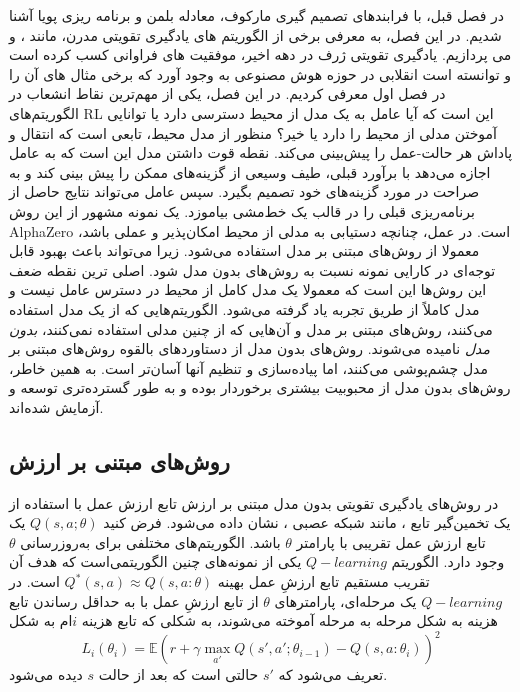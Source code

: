 
در فصل قبل، با فرابندهای تصمیم گیری مارکوف، معادله بلمن و برنامه ریزی پویا آشنا شدیم. در این فصل، به معرفی برخی از الگوریتم های یادگیری تقویتی مدرن، مانند
،
 و 
  می پردازیم. یادگیری تقویتی ژرف در دهه اخیر، موفقیت های فراوانی کسب کرده است و توانسته است انقلابی در حوزه هوش مصنوعی به وجود آورد که برخی مثال های آن را در فصل اول معرفی کردیم. در این فصل، 
یکی از مهم‌ترین نقاط انشعاب در الگوریتم‌‌های RL این است که آیا عامل به یک مدل از محیط دسترسی دارد یا  توانایی آموختن مدلی از محیط را دارد یا خیر؟ منظور از مدل محیط، تابعی است که انتقال و پاداش هر حالت-عمل را پیش‌بینی می‌کند.
نقطه قوت داشتن مدل این است که به عامل اجازه می‌دهد با برآورد قبلی، طیف وسیعی از گزینه‌های ممکن را پیش بینی کند و به صراحت در مورد گزینه‌های خود تصمیم بگیرد. سپس عامل می‌تواند نتایج حاصل از برنامه‌ریزی قبلی را در قالب یک خط‌مشی بیاموزد. یک نمونه مشهور از این روش 
AlphaZero است. در عمل، چنانچه دستیابی به مدلی از محیط امکان‌پذیر و عملی باشد، معمولا از روش‌های مبتنی بر مدل استفاده می‌شود. زیرا می‌تواند باعث بهبود قابل توجه‌ای در کارایی نمونه نسبت به روش‌های بدون مدل شود. اصلی ترین نقطه ضعف این روش‌ها این است که معمولا یک مدل کامل از محیط  در دسترس عامل نیست و مدل کاملاً از طریق تجربه یاد گرفته می‌شود. الگوریتم‌هایی که از یک مدل استفاده می‌کنند، روش‌های مبتنی بر مدل و آن‌هایی که از چنین مدلی استفاده نمی‌کنند، \textit{بدون مدل} نامیده می‌شوند. روش‌های بدون مدل از دستاوردهای بالقوه روش‌های مبتنی بر مدل چشم‌پوشی می‌کنند‌، اما پیاده‌سازی و تنظیم آنها آسان‌تر است. به همین خاطر، روش‌های بدون مدل از محبوبیت بیشتری برخوردار بوده و به طور گسترده‌تری توسعه و آزمایش شده‌اند.

\subsection{روش‌های مبتنی بر ارزش}


در روش‌های یادگیری تقویتی بدون مدل مبتنی بر ارزش
تابع ارزش عمل با استفاده از  یک تخمین‌گیر تابع
 ، مانند شبکه عصبی ، نشان داده می‌شود. فرض کنید
$Q(s,a;\theta)$
یک تابع ارزش عمل تقریبی با پارامتر  
$\theta$ 
باشد.
الگوریتم‌های مختلفی برای به‌روزرسانی $\theta$ وجود دارد.
الگوریتم $ Q-learning$ یکی از نمونه‌های چنین الگوریتمی‌است
که هدف آن تقریب مستقیم تابع ارزشِ عمل بهینه 
$Q^*(s,a) \approx Q(s,a: \theta)$
 است. در $ Q-learning$ یک مرحله‌ای، پارامترهای $\theta$ از تابع ارزشِ عمل با به حداقل رساندن تابع هزینه به شکل مرحله به مرحله آموخته می‌شوند، به شکلی که تابع هزینه $i$ام به شکل 
$$L_i(\theta_i) = \mathbb{E} {\left( r+\gamma \max_{a'} Q(s',a'; \theta_{i-1})- Q(s,a:\theta_i) \right)}^2$$
 تعریف می‌شود که 
 $s'$
 حالتی است که بعد از حالت $s$ دیده می‌شود.
